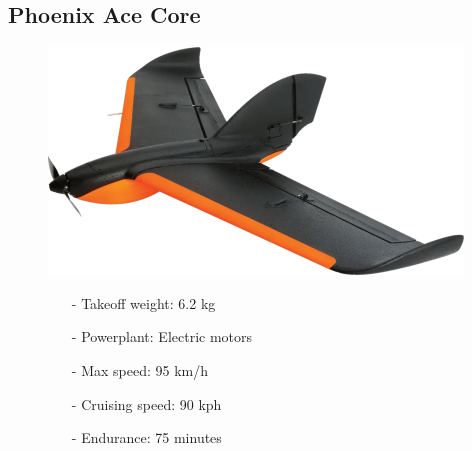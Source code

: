 \documentclass{article}
\begin{document}
\subsection{Phoenix Ace Core}
\begin{figure}[h]
    \begin{minipage}[b]{.45\linewidth}
        \centering
        \includegraphics[width=0.7\linewidth]{Aircraft pics/Pheonix Ace core.png}       
    \end{minipage}\hfill
    \begin{minipage}[b]{0.45\linewidth}
        \begin{itemize}
            \item [-] Takeoff weight: 6.2 kg
            \item [-] Powerplant: Electric motors
            \item [-] Max speed: 95 km/h 
            \item [-] Cruising speed: 90 kph 
            \item [-] Endurance: 75 minutes
        \end{itemize}
    \end{minipage}
\end{figure}

\vspace{\fill}
\end{document}
